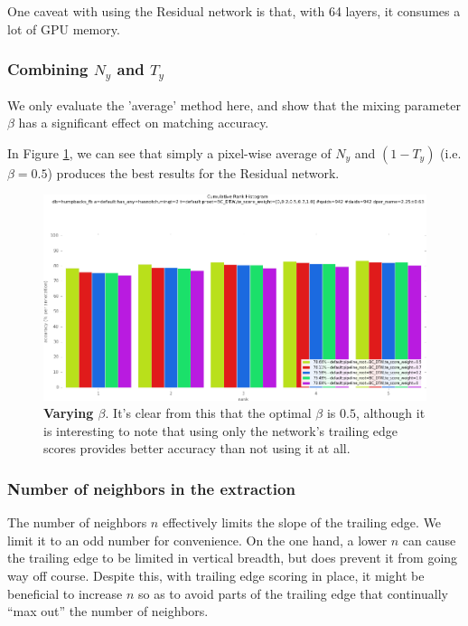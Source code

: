 One caveat with using the Residual network is that, with 64 layers, it consumes a lot of GPU memory.

\subsubsection{Combining $N_y$ and $T_y$}

We only evaluate the 'average' method here, and show that the mixing parameter $\beta$ has a significant effect on matching accuracy.

In Figure \ref{fig:vary_te_weight}, we can see that simply a pixel-wise average of $N_y$ and $(1-T_y)$ (i.e. $\beta = 0.5$) produces the best results for the Residual network.

\begin{figure}[t]%
\centering
\includegraphics[width=1\textwidth]{../images/results/vary_te_weight.png}
\caption[]{\textbf{Varying $\beta$}. It's clear from this that the optimal $\beta$ is $0.5$, although it is interesting to note that using only the network's trailing edge scores provides better accuracy than not using it at all.}
\label{fig:vary_te_weight}
\end{figure}


\subsubsection{Number of neighbors in the extraction}

The number of neighbors $n$ effectively limits the slope of the trailing edge.
We limit it to an odd number for convenience.
On the one hand, a lower $n$ can cause the trailing edge to be limited in vertical breadth, but does prevent it from going way off course.
Despite this, with trailing edge scoring in place, it might be beneficial to increase $n$ so as to avoid parts of the trailing edge that continually ``max out'' the number of neighbors.

